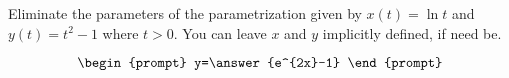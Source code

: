 \documentclass{ximera}
\author{Gregory Hartman \and Matthew Carr}
\begin{document}
\begin{exercise}




Eliminate the parameters of the parametrization given by $x(t)=\ln t$ and $y(t)=t^2-1$ where $t>0$. You can leave $x$ and $y$ implicitly defined, if need be.

\[
\begin{prompt}
y=\answer{e^{2x}-1}
\end{prompt}
\]

\end{exercise}
\end{document}
